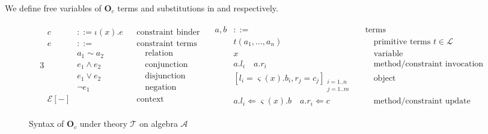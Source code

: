 We define free variables of $\textbf{O}_c$ terms and substitutions in
 and  respectively.\\

\begin{figure*}[t]
  \centering
  \begin{alignat*}{3}
    \begin{aligned}
      c   & ::= \iota(x) . e && \text{constraint binder}\\
      e   & ::= && \text{constraint terms}\\
          & a_1 \sim a_2   && \quad \text{relation}\\
          & e_1 \land e_2  && \quad \text{conjunction}\\
          & e_1 \vee e_2   && \quad \text{disjunction}\\
          & \neg e_1       && \quad \text{negation}\\
     \mathcal{E}[-] & && \text{context}
    \end{aligned}
    \quad
    \begin{aligned}
      a,b & ::= && \text{terms}\\
          & t(a_1, \ldots, a_n)   && \quad \text{primitive terms } t \in \mathcal{L} \\
          & x    && \quad \text{variable}\\
          & a.l_i \quad a.r_i && \quad \text{method/constraint invocation}\\
          & [ l_i = \varsigma (x) . b_i , r_j = c_j ]_{\substack{i = 1..n\\j = 1..m}} && \quad \text{object}\\
          & a.l_i \Leftarrow \varsigma (x) . b \quad a.r_i \Leftarrow c && \quad \text{method/constraint update}
    \end{aligned}
  \end{alignat*}
  \caption{Syntax of $\textbf{O}_c$ under theory $\mathcal{T}$ on algebra $\mathcal{A}$}
  \label{Oc:syntax}
\end{figure*}

